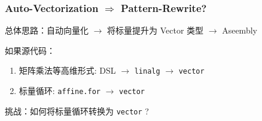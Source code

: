 \documentclass[aspectratio=169]{ctexbeamer}
\begin{document}
\begin{frame}
    \frametitle{Auto-Vectorization $\Rightarrow$ Pattern-Rewrite?}

    总体思路：自动向量化 $\rightarrow$ 将标量提升为 Vector 类型 $\rightarrow$ Aseembly

    \hspace{2em}

    如果源代码：
    \begin{enumerate}
        \item 矩阵乘法等高维形式: DSL $\rightarrow$ \texttt{linalg} $\rightarrow$ \texttt{vector}
        \item 标量循环: \texttt{affine.for} $\rightarrow$ \texttt{vector}
    \end{enumerate}

    \begin{center}
        挑战：如何将标量循环转换为 \texttt{vector} ?
    \end{center}

\end{frame}
\end{document}
